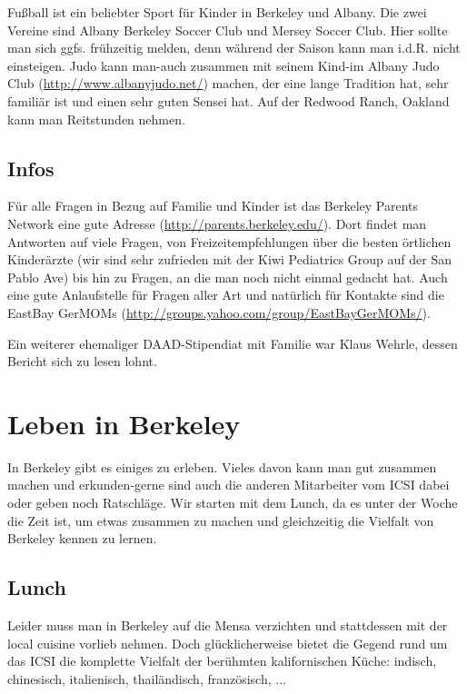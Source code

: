 \documentclass[a4paper]{scrreprt}
\begin{document}
Fußball ist ein beliebter Sport für Kinder in Berkeley und Albany. Die zwei Vereine sind Albany Berkeley Soccer Club und Mersey Soccer Club. Hier sollte man sich ggfs. frühzeitig melden, denn während der Saison kann man i.d.R. nicht einsteigen. Judo kann man-auch zusammen mit seinem Kind-im Albany Judo Club (\url{http://www.albanyjudo.net/}) machen, der eine lange Tradition hat, sehr familiär ist und einen sehr guten Sensei hat. Auf der Redwood Ranch, Oakland kann man Reitstunden nehmen.

\section{Infos}

Für alle Fragen in Bezug auf Familie und Kinder ist das Berkeley Parents Network eine gute Adresse (\url{http://parents.berkeley.edu/}). Dort findet man Antworten auf viele Fragen, von Freizeitempfehlungen über die besten örtlichen Kinderärzte (wir sind sehr zufrieden mit der Kiwi Pediatrics Group auf der San Pablo Ave) bis hin zu Fragen, an die man noch nicht einmal gedacht hat. Auch eine gute Anlaufstelle für Fragen aller Art und natürlich für Kontakte sind die EastBay GerMOMs (\url{http://groups.yahoo.com/group/EastBayGerMOMs/}).

Ein weiterer ehemaliger DAAD-Stipendiat mit Familie war Klaus Wehrle, dessen Bericht sich zu lesen lohnt.

\chapter{Leben in Berkeley}

In Berkeley gibt es einiges zu erleben. Vieles davon kann man gut zusammen machen und erkunden-gerne sind auch die anderen Mitarbeiter vom ICSI dabei oder geben noch Ratschläge. Wir starten mit dem Lunch, da es unter der Woche die Zeit ist, um etwas zusammen zu machen und gleichzeitig die Vielfalt von Berkeley kennen zu lernen.

\section{Lunch}

Leider muss man in Berkeley auf die Mensa verzichten und stattdessen mit der local cuisine vorlieb nehmen. Doch glücklicherweise bietet die Gegend rund um das ICSI die komplette Vielfalt der berühmten kalifornischen Küche: indisch, chinesisch, italienisch, thailändisch, französisch, ...
\end{document}
